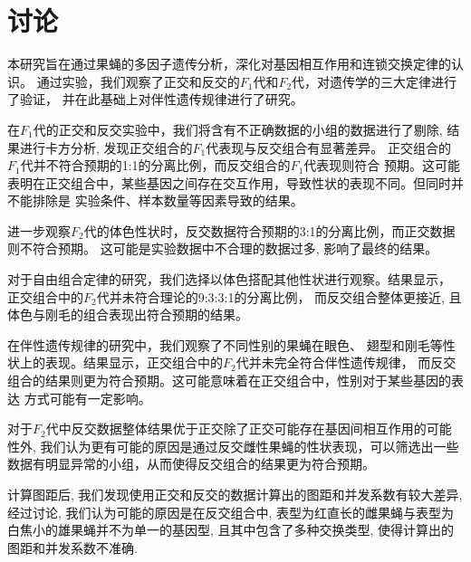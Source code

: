 \documentclass[AutoFakeBold]{LZUThesis}
\begin{document}
\chapter{讨论}

本研究旨在通过果蝇的多因子遗传分析，深化对基因相互作用和连锁交换定律的认识。
通过实验，我们观察了正交和反交的$F_1$代和$F_2$代，对遗传学的三大定律进行了验证，
并在此基础上对伴性遗传规律进行了研究。\par

在$F_1$代的正交和反交实验中，我们将含有不正确数据的小组的数据进行了剔除, 
结果进行卡方分析, 发现正交组合的$F_1$代表现与反交组合有显著差异。
正交组合的$F_1$代并不符合预期的1:1的分离比例，而反交组合的$F_1$代表现则符合
预期。这可能表明在正交组合中，某些基因之间存在交互作用，导致性状的表现不同。但同时并不能排除是
实验条件、样本数量等因素导致的结果。\par

进一步观察$F_2$代的体色性状时，反交数据符合预期的3:1的分离比例，而正交数据则不符合预期。
这可能是实验数据中不合理的数据过多, 影响了最终的结果。\par

对于自由组合定律的研究，我们选择以体色搭配其他性状进行观察。结果显示，
正交组合中的$F_2$代并未符合理论的9:3:3:1的分离比例，
而反交组合整体更接近, 且体色与刚毛的组合表现出符合预期的结果。

在伴性遗传规律的研究中，我们观察了不同性别的果蝇在眼色、
翅型和刚毛等性状上的表现。结果显示，正交组合中的$F_2$代并未完全符合伴性遗传规律，
而反交组合的结果则更为符合预期。这可能意味着在正交组合中，性别对于某些基因的表达
方式可能有一定影响。\par

对于$F_2$代中反交数据整体结果优于正交除了正交可能存在基因间相互作用的可能性外, 
我们认为更有可能的原因是通过反交雌性果蝇的性状表现，可以筛选出一些
数据有明显异常的小组，从而使得反交组合的结果更为符合预期。\par

计算图距后, 我们发现使用正交和反交的数据计算出的图距和并发系数有较大差异, 
经过讨论, 我们认为可能的原因是在反交组合中, 表型为红直长的雌果蝇与表型为
白焦小的雄果蝇并不为单一的基因型, 且其中包含了多种交换类型, 使得计算出的图距和并发系数不准确.\par
\end{document}
